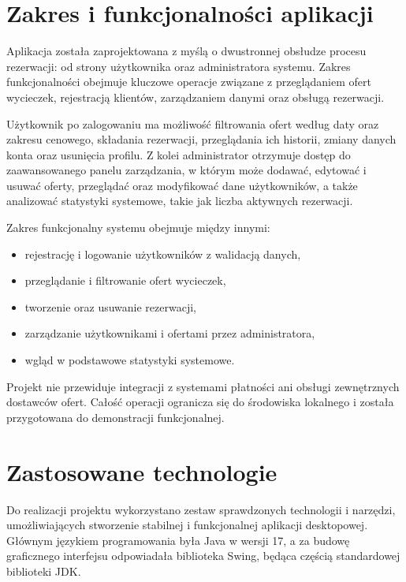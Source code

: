 
\section{Zakres i funkcjonalności aplikacji}
\label{sec:Zakres i funkcjonalności aplikacji}

Aplikacja została zaprojektowana z myślą o dwustronnej obsłudze procesu rezerwacji: od strony użytkownika oraz administratora systemu. Zakres funkcjonalności obejmuje kluczowe operacje związane z przeglądaniem ofert wycieczek, rejestracją klientów, zarządzaniem danymi oraz obsługą rezerwacji.

Użytkownik po zalogowaniu ma możliwość filtrowania ofert według daty oraz zakresu cenowego, składania rezerwacji, przeglądania ich historii, zmiany danych konta oraz usunięcia profilu. Z kolei administrator otrzymuje dostęp do zaawansowanego panelu zarządzania, w którym może dodawać, edytować i usuwać oferty, przeglądać oraz modyfikować dane użytkowników, a także analizować statystyki systemowe, takie jak liczba aktywnych rezerwacji.

Zakres funkcjonalny systemu obejmuje między innymi:
\begin{itemize}
    \item rejestrację i logowanie użytkowników z walidacją danych,
    \item przeglądanie i filtrowanie ofert wycieczek,
    \item tworzenie oraz usuwanie rezerwacji,
    \item zarządzanie użytkownikami i ofertami przez administratora,
    \item wgląd w podstawowe statystyki systemowe.
\end{itemize}

Projekt nie przewiduje integracji z systemami płatności ani obsługi zewnętrznych dostawców ofert. Całość operacji ogranicza się do środowiska lokalnego i została przygotowana do demonstracji funkcjonalnej.


\section{Zastosowane technologie}
\label{sec:zawartoscPracy}

Do realizacji projektu wykorzystano zestaw sprawdzonych technologii i narzędzi, umożliwiających stworzenie stabilnej i funkcjonalnej aplikacji desktopowej. Głównym językiem programowania była Java w wersji 17, a za budowę graficznego interfejsu odpowiadała biblioteka Swing, będąca częścią standardowej biblioteki JDK.

